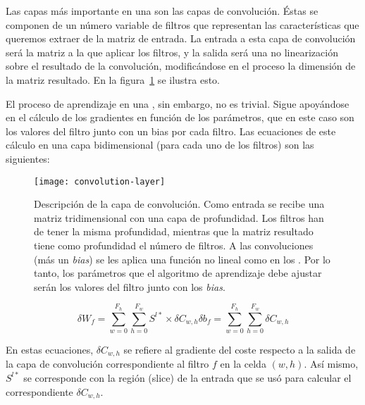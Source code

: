Las capas más importante en una  son las capas de convolución. Éstas se componen de un número variable de filtros que representan las características que queremos extraer de la matriz de entrada. La entrada a esta capa de convolución será la matriz a la que aplicar los filtros, y la salida será una no linearización sobre el resultado de la convolución, modificándose en el proceso la dimensión de la matriz resultado. En la figura~\ref{fig:cnn-convolution-layer} se ilustra esto.

El proceso de aprendizaje en una , sin embargo, no es trivial. Sigue apoyándose en el cálculo de los gradientes en función de los parámetros, que en este caso son los valores del filtro junto con un bias por cada filtro. Las ecuaciones de este cálculo en una capa bidimensional (para cada uno de los filtros) son las siguientes:

\begin{figure}[t]
	\centering
	\texttt{[image: convolution-layer]}
	\caption[Descripción de la capa de convolución]{Descripción de la capa de convolución. Como entrada se recibe una matriz tridimensional con una capa de profundidad. Los filtros han de tener la misma profundidad, mientras que la matriz resultado tiene como profundidad el número de filtros. A las convoluciones (más un \textit{bias}) se les aplica una función no lineal como en los . Por lo tanto, los parámetros que el algoritmo de aprendizaje debe ajustar serán los valores del filtro junto con los \textit{bias}.}
	\label{fig:cnn-convolution-layer}
\end{figure}

\begin{subequations}
	\begin{equation}
		\delta W_f = \sum_{w=0}^{F_h} \sum_{h=0}^{F_w} S^{l*} \times \delta C_{w,h} \label{eq:cnn-error-weights}
	\end{equation}
	\begin{equation}
		\delta b_f = \sum_{w=0}^{F_h} \sum_{h=0}^{F_w} \delta C_{w,h} \label{eq:cnn-error-biases}
	\end{equation}
\end{subequations}

En estas ecuaciones, $\delta C_{w,h}$ se refiere al gradiente del coste respecto a la salida de la capa de convolución correspondiente al filtro $f$ en la celda $(w, h)$. Así mismo, $S^{l*}$ se corresponde con la región (slice) de la entrada que se usó para calcular el correspondiente $\delta C_{w,h}$.

